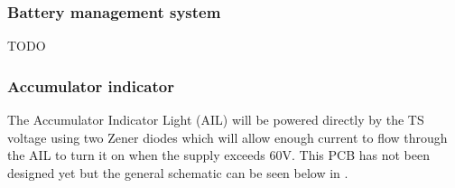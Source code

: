 \documentclass{article}
\begin{document}
\subsubsection{Battery management system}\label{accumulator_battery_management_system}

TODO

\subsubsection{Accumulator indicator}\label{accumulator_indicator}
The Accumulator Indicator Light (AIL) will be powered directly by the TS voltage using two Zener diodes which will allow enough current to flow through the AIL to turn it on when the supply exceeds 60V. This PCB has not been designed yet but the general schematic can be seen below in .
\end{document}
